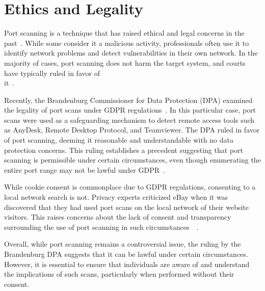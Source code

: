 \section{Ethics and Legality}
Port scanning is a technique that has raised ethical and legal concerns in the past~\cite{jamieson2001}. While some consider it a malicious activity, professionals often use it to identify network problems and detect vulnerabilities in their own network. In the majority of cases, port scanning does not harm the target system, and courts have typically ruled in favor of \\ it~\cite{Lyon2009}.

Recently, the Brandenburg Commissioner for Data Protection (DPA) examined the legality of port scans under GDPR regulations~\cite{gdpr}. In this particular case, port scans were used as a safeguarding mechanism to detect remote access tools such as AnyDesk, Remote Desktop Protocol, and Teamviewer. The DPA ruled in favor of port scanning, deeming it reasonable and understandable with no data protection concerns. This ruling establishes a precedent suggesting that port scanning is permissible under certain circumstances, even though enumerating the entire port range may not be lawful under GDPR~\cite{edpb_decision}.

While cookie consent is commonplace due to GDPR regulations, consenting to a local network search is not. Privacy experts criticized eBay when it was discovered that they had used port scans on the local network of their website visitors. This raises concerns about the lack of consent and transparency surrounding the use of port scanning in such circumstances~\cite{ebay_port_scans}~\cite{forbes_ebay}.

Overall, while port scanning remains a controversial issue, the ruling by the Brandenburg DPA suggests that it can be lawful under certain circumstances. However, it is essential to ensure that individuals are aware of and understand the implications of such scans, particularly when performed without their consent.